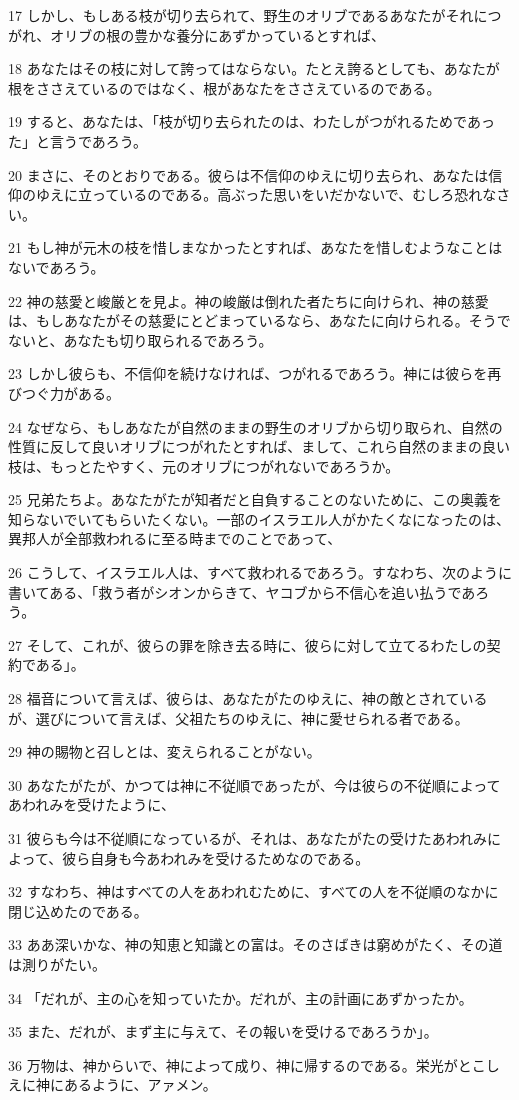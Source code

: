 \par 17 しかし、もしある枝が切り去られて、野生のオリブであるあなたがそれにつがれ、オリブの根の豊かな養分にあずかっているとすれば、
\par 18 あなたはその枝に対して誇ってはならない。たとえ誇るとしても、あなたが根をささえているのではなく、根があなたをささえているのである。
\par 19 すると、あなたは、「枝が切り去られたのは、わたしがつがれるためであった」と言うであろう。
\par 20 まさに、そのとおりである。彼らは不信仰のゆえに切り去られ、あなたは信仰のゆえに立っているのである。高ぶった思いをいだかないで、むしろ恐れなさい。
\par 21 もし神が元木の枝を惜しまなかったとすれば、あなたを惜しむようなことはないであろう。
\par 22 神の慈愛と峻厳とを見よ。神の峻厳は倒れた者たちに向けられ、神の慈愛は、もしあなたがその慈愛にとどまっているなら、あなたに向けられる。そうでないと、あなたも切り取られるであろう。
\par 23 しかし彼らも、不信仰を続けなければ、つがれるであろう。神には彼らを再びつぐ力がある。
\par 24 なぜなら、もしあなたが自然のままの野生のオリブから切り取られ、自然の性質に反して良いオリブにつがれたとすれば、まして、これら自然のままの良い枝は、もっとたやすく、元のオリブにつがれないであろうか。
\par 25 兄弟たちよ。あなたがたが知者だと自負することのないために、この奥義を知らないでいてもらいたくない。一部のイスラエル人がかたくなになったのは、異邦人が全部救われるに至る時までのことであって、
\par 26 こうして、イスラエル人は、すべて救われるであろう。すなわち、次のように書いてある、「救う者がシオンからきて、ヤコブから不信心を追い払うであろう。
\par 27 そして、これが、彼らの罪を除き去る時に、彼らに対して立てるわたしの契約である」。
\par 28 福音について言えば、彼らは、あなたがたのゆえに、神の敵とされているが、選びについて言えば、父祖たちのゆえに、神に愛せられる者である。
\par 29 神の賜物と召しとは、変えられることがない。
\par 30 あなたがたが、かつては神に不従順であったが、今は彼らの不従順によってあわれみを受けたように、
\par 31 彼らも今は不従順になっているが、それは、あなたがたの受けたあわれみによって、彼ら自身も今あわれみを受けるためなのである。
\par 32 すなわち、神はすべての人をあわれむために、すべての人を不従順のなかに閉じ込めたのである。
\par 33 ああ深いかな、神の知恵と知識との富は。そのさばきは窮めがたく、その道は測りがたい。
\par 34 「だれが、主の心を知っていたか。だれが、主の計画にあずかったか。
\par 35 また、だれが、まず主に与えて、その報いを受けるであろうか」。
\par 36 万物は、神からいで、神によって成り、神に帰するのである。栄光がとこしえに神にあるように、アァメン。

